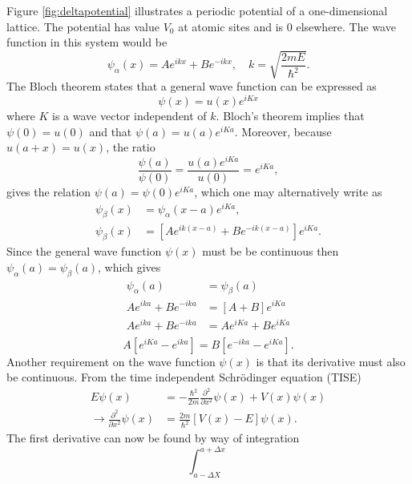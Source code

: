 \documentclass[11pt]{amsart}
\begin{document}
Figure \ref{fig:deltapotential} illustrates a periodic potential of a one-dimensional lattice. The potential has value $V_0$ at atomic sites and is $0$ elsewhere. The wave function in this system would be
\begin{equation}
\psi_{\alpha}(x) = Ae^{ikx} + Be^{-ikx}, \quad k = \sqrt{\frac{2mE}{\hbar^2}}.
\end{equation}
The Bloch theorem states that a general wave function can be expressed as
\begin{equation}
\psi(x) = u(x)e^{iKx}
\end{equation}
where $K$ is a wave vector independent of $k$. Bloch's theorem implies that $\psi(0) = u(0)$ and that $\psi(a) = u(a)e^{iKa}$. Moreover, because $u(a+x) = u(x)$, the ratio
\begin{equation*}
\frac{\psi(a)}{\psi(0)} = \frac{u(a)e^{iKa}}{u(0)} = e^{iKa},
\end{equation*}
gives the relation $\psi(a) = \psi(0)e^{iKa}$, which one may alternatively write as
\begin{align*}
\psi_{\beta}(x) &= \psi_{\alpha}(x-a)e^{iKa}, \\
\psi_{\beta}(x) &= \left[Ae^{ik(x-a)} + Be^{-ik(x-a)} \right]e^{iKa}.
\end{align*}
Since the general wave function $\psi(x)$ must be be continuous then $\psi_{\alpha}(a) = \psi_{\beta}(a)$, which gives
\begin{align*}
\psi_{\alpha}(a) &= \psi_{\beta}(a) \\
Ae^{ika} + Be^{-ika} &= [A + B]e^{iKa} \\
Ae^{ika} + Be^{-ika} &= Ae^{iKa} + Be^{iKa} \\
\end{align*}
\begin{equation}
A \left[e^{iKa} - e^{ika} \right] = B \left[e^{-ika} - e^{iKa} \right].
\end{equation}
Another requirement on the wave function $\psi(x)$ is that its derivative must also be continuous. From the time independent Schrödinger equation (TISE)
\begin{align*}
E\psi(x) &= -\frac{\hbar^2}{2m}\frac{\partial^2}{\partial x^2}\psi(x) + V(x) \psi(x) \\
\rightarrow \frac{\partial^2}{\partial x^2} \psi(x) &= \frac{2m}{\hbar^2}[V(x) - E]\psi(x).
\end{align*}
The first derivative can now be found by way of integration
\begin{equation}
\int_{a-\Delta X}^{a+\Delta x}
\end{equation}
\end{document}
